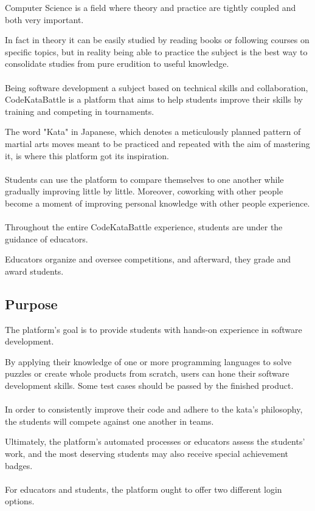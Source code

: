 \setlength{\leftmargini}{5em} %
Computer Science is a field where theory and practice are tightly coupled and both very important. 

In fact in theory it can be easily studied by reading books or following courses on specific topics, but in reality being able to practice the subject is the best way to consolidate studies from pure erudition to useful knowledge.\\
\\
Being software development a subject based on technical skills and collaboration, CodeKataBattle is a platform that aims to help students improve their skills by training and competing in tournaments.

The word "Kata" in Japanese, which denotes a meticulously planned pattern of martial arts moves meant to be practiced and repeated with the aim of mastering it, is where this platform got its inspiration.\\ 
\\
Students can use the platform to compare themselves to one another while gradually improving little by little. Moreover, coworking with other people become a moment of improving personal knowledge with other people experience.\\
\\
Throughout the entire CodeKataBattle experience, students are under the guidance of educators.

Educators organize and oversee competitions, and afterward, they grade and award students.

\subsection{Purpose}
The platform's goal is to provide students with hands-on experience in software development.

By applying their knowledge of one or more programming languages to solve puzzles or create whole products from scratch, users can hone their software development skills. Some test cases should be passed by the finished product.\\
\\
In order to consistently improve their code and adhere to the kata's philosophy, the students will compete against one another in teams.

Ultimately, the platform's automated processes or educators assess the students' work, and the most deserving students may also receive special achievement badges.\\
\\
For educators and students, the platform ought to offer two different login options.

